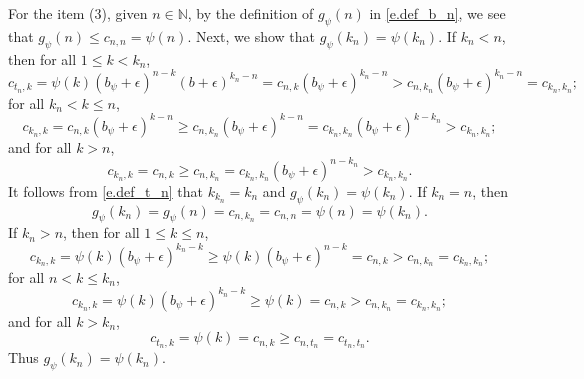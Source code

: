 \documentclass[12pt,reqno]{amsart}
\renewcommand{\=}{\coloneqq}
\theoremstyle{plain}
\begin{document}
For the item (3), given $n\in \mathbb N$, by the definition of $g_\psi(n)$ in \eqref{e.def_b_n}, we see that $g_{\psi}(n)
    \leq c_{n,n}=\psi(n)$. Next, we show that $g_{\psi}(k_n)=\psi(k_n)$.
If $k_n<n$, then for all $1\leq k< k_n$,
    \begin{equation*}
        c_{t_n,k}
        =\psi(k)(b_\psi+\epsilon)^{n-k}(b+\epsilon)^{k_n-n}
        =c_{n,k}(b_\psi+\epsilon)^{k_n-n}
        >c_{n,k_n}(b_\psi+\epsilon)^{k_n-n}
        =c_{k_n,k_n};
    \end{equation*}
for all $k_n<k\leq n$,
    \begin{equation*}
        c_{k_n,k}= c_{n,k}(b_\psi+\epsilon)^{k-n}
        \geq c_{n,k_n}(b_\psi+\epsilon)^{k-n}
        = c_{k_n,k_n}(b_\psi+\epsilon)^{k-k_n}
        >c_{k_n,k_n};
    \end{equation*}
 and for all $k>n$,
    \begin{equation*}
        c_{k_n,k}= c_{n,k}
        \geq c_{n,k_n}
        = c_{k_n,k_n} (b_\psi+\epsilon)^{n-k_n}
        >c_{k_n,k_n}.
    \end{equation*}
  It follows from \eqref{e.def_t_n} that $k_{k_n}=k_n$ and $g_{\psi}(k_n)=\psi(k_n)$. If $k_n=n$, then
    \begin{equation*}
       g_{\psi}(k_n)=g_{\psi}(n)=c_{n,k_n}=c_{n,n}=\psi(n)=\psi(k_n).
    \end{equation*}
If $k_n>n$, then
    for all $1\leq k\leq n$,
    \begin{equation*}
        c_{k_n,k}= \psi(k)(b_\psi+\epsilon)^{k_n-k}
        \geq \psi(k)(b_\psi+\epsilon)^{n-k}
        =c_{n,k}
        >c_{n,k_n}
        =c_{k_n,k_n};
    \end{equation*}
    for all $n<k\leq k_n$,
    \begin{equation*}
        c_{k_n,k}= \psi(k)(b_\psi+\epsilon)^{k_n-k}
        \geq \psi(k)
        =c_{n,k}
        >c_{n,k_n}
        =c_{k_n,k_n};
    \end{equation*}
    and for all $k>k_n$,
    \begin{equation*}
        c_{t_n,k}=\psi(k)
        =c_{n,k}
        \geq c_{n,t_n}
        =c_{t_n,t_n}.
    \end{equation*}
    Thus $g_{\psi}(k_n)=\psi(k_n)$.
\end{document}
